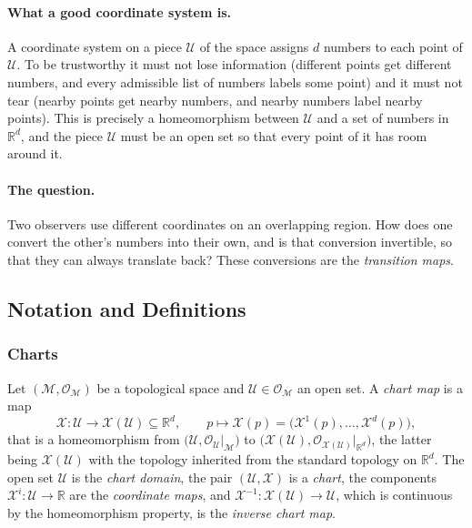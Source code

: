 \documentclass[11pt]{article}
\begin{document}
\paragraph{What a good coordinate system is.}
A coordinate system on a piece $\mathcal U$ of the space assigns $d$ numbers to each point of $\mathcal U$. To be trustworthy it must not lose information (different points get different numbers, and every admissible list of numbers labels some point) and it must not tear (nearby points get nearby numbers, and nearby numbers label nearby points). This is precisely a homeomorphism between $\mathcal U$ and a set of numbers in $\mathbb R^d$, and the piece $\mathcal U$ must be an open set so that every point of it has room around it.

\paragraph{The question.}
Two observers use different coordinates on an overlapping region. How does one convert the other's numbers into their own, and is that conversion invertible, so that they can always translate back? These conversions are the \emph{transition maps}.

\subsection*{Notation and Definitions}

\subsubsection*{Charts}
Let $(\mathcal M,\mathcal O_{\mathcal M})$ be a topological space and $\mathcal U\in\mathcal O_{\mathcal M}$ an open set. A \emph{chart map} is a map
\[
\mathcal X:\mathcal U\longrightarrow\mathcal X(\mathcal U)\subseteq\mathbb R^d,\qquad p\longmapsto\mathcal X(p)=\big(\mathcal X^1(p),\dots,\mathcal X^d(p)\big),
\]
that is a homeomorphism from $\big(\mathcal U,\mathcal O_{\mathcal U}|_{\mathcal M}\big)$ to $\big(\mathcal X(\mathcal U),\mathcal O_{\mathcal X(\mathcal U)}|_{\mathbb R^d}\big)$, the latter being $\mathcal X(\mathcal U)$ with the topology inherited from the standard topology on $\mathbb R^d$. The open set $\mathcal U$ is the \emph{chart domain}, the pair $(\mathcal U,\mathcal X)$ is a \emph{chart}, the components $\mathcal X^i:\mathcal U\to\mathbb R$ are the \emph{coordinate maps}, and $\mathcal X^{-1}:\mathcal X(\mathcal U)\to\mathcal U$, which is continuous by the homeomorphism property, is the \emph{inverse chart map}.
\end{document}
